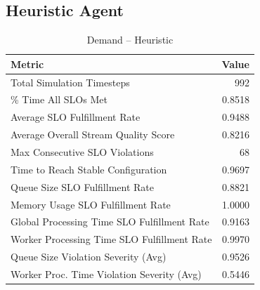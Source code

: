 \subsection*{Heuristic Agent}
\begin{table}[h]
\centering
\caption{Demand – Heuristic}
\label{tab:demand_heuristic}
\begin{tabular}{lr}
\toprule
Metric & Value \\
\midrule
Total Simulation Timesteps & 992 \\
\% Time All SLOs Met & 0.8518 \\
Average SLO Fulfillment Rate & 0.9488 \\
Average Overall Stream Quality Score & 0.8216 \\
Max Consecutive SLO Violations & 68 \\
Time to Reach Stable Configuration & 0.9697 \\
Queue Size SLO Fulfillment Rate & 0.8821 \\
Memory Usage SLO Fulfillment Rate & 1.0000 \\
Global Processing Time SLO Fulfillment Rate & 0.9163 \\
Worker Processing Time SLO Fulfillment Rate & 0.9970 \\
Queue Size Violation Severity (Avg) & 0.9526 \\
Worker Proc. Time Violation Severity (Avg) & 0.5446 \\
\bottomrule
\end{tabular}
\end{table}


